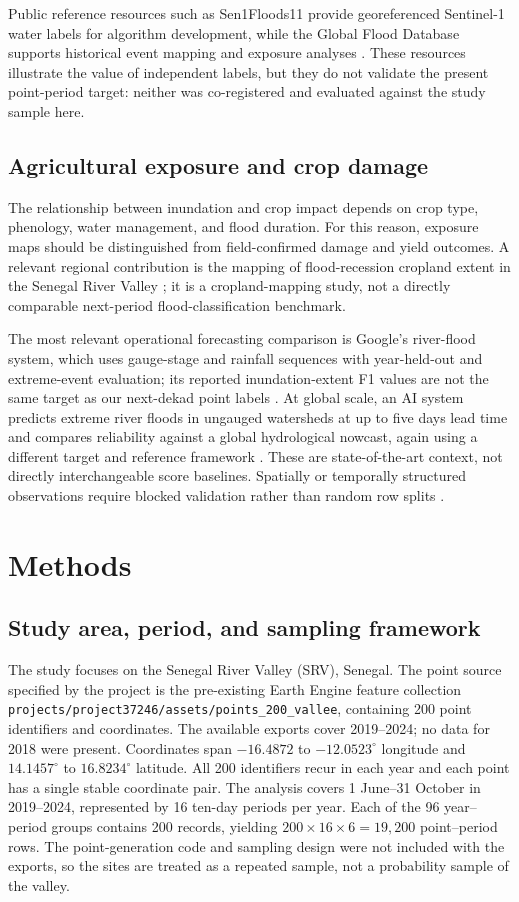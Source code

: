 \documentclass[pdflatex,sn-mathphys,Numbered]{sn-jnl}
\begin{document}
Public reference resources such as Sen1Floods11 provide georeferenced Sentinel-1 water labels for algorithm development, while the Global Flood Database supports historical event mapping and exposure analyses \cite{bonafilia2020,tellman2021}. These resources illustrate the value of independent labels, but they do not validate the present point-period target: neither was co-registered and evaluated against the study sample here.

\subsection{Agricultural exposure and crop damage}
The relationship between inundation and crop impact depends on crop type, phenology, water management, and flood duration. For this reason, exposure maps should be distinguished from field-confirmed damage and yield outcomes. A relevant regional contribution is the mapping of flood-recession cropland extent in the Senegal River Valley \cite{bruckmann2025}; it is a cropland-mapping study, not a directly comparable next-period flood-classification benchmark.

The most relevant operational forecasting comparison is Google's river-flood system, which uses gauge-stage and rainfall sequences with year-held-out and extreme-event evaluation; its reported inundation-extent F1 values are not the same target as our next-dekad point labels \cite{nevo2022}. At global scale, an AI system predicts extreme river floods in ungauged watersheds at up to five days lead time and compares reliability against a global hydrological nowcast, again using a different target and reference framework \cite{nearing2024}. These are state-of-the-art context, not directly interchangeable score baselines. Spatially or temporally structured observations require blocked validation rather than random row splits \cite{roberts2017}.

\section{Methods}
\subsection{Study area, period, and sampling framework}
The study focuses on the Senegal River Valley (SRV), Senegal. The point source specified by the project is the pre-existing Earth Engine feature collection \texttt{projects/project37246/assets/points\_200\_vallee}, containing 200 point identifiers and coordinates. The available exports cover 2019--2024; no data for 2018 were present. Coordinates span $-16.4872$ to $-12.0523^\circ$ longitude and $14.1457^\circ$ to $16.8234^\circ$ latitude. All 200 identifiers recur in each year and each point has a single stable coordinate pair. The analysis covers 1 June--31 October in 2019--2024, represented by 16 ten-day periods per year. Each of the 96 year--period groups contains 200 records, yielding $200\times16\times6=19{,}200$ point--period rows. The point-generation code and sampling design were not included with the exports, so the sites are treated as a repeated sample, not a probability sample of the valley.
\end{document}
